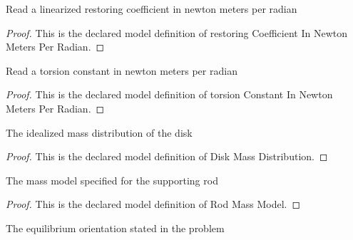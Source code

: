 \begin{definition}
  \label{def:physics:phyx-mini-0270:phyxminiproblems-problemphyxmini0270-restoringcoefficientinnewtonmetersperradian}
  Read a linearized restoring coefficient in newton meters per radian
\end{definition}
\begin{proof}
  This is the declared model definition of restoring Coefficient In Newton Meters Per Radian.
\end{proof}
\begin{definition}
  \label{def:physics:phyx-mini-0270:phyxminiproblems-problemphyxmini0270-torsionconstantinnewtonmetersperradian}
  Read a torsion constant in newton meters per radian
\end{definition}
\begin{proof}
  This is the declared model definition of torsion Constant In Newton Meters Per Radian.
\end{proof}
\begin{definition}
  \label{def:physics:phyx-mini-0270:phyxminiproblems-problemphyxmini0270-diskmassdistribution}
  The idealized mass distribution of the disk
\end{definition}
\begin{proof}
  This is the declared model definition of Disk Mass Distribution.
\end{proof}
\begin{definition}
  \label{def:physics:phyx-mini-0270:phyxminiproblems-problemphyxmini0270-rodmassmodel}
  The mass model specified for the supporting rod
\end{definition}
\begin{proof}
  This is the declared model definition of Rod Mass Model.
\end{proof}
\begin{definition}
  \label{def:physics:phyx-mini-0270:phyxminiproblems-problemphyxmini0270-equilibriumorientation}
  The equilibrium orientation stated in the problem
\end{definition}
